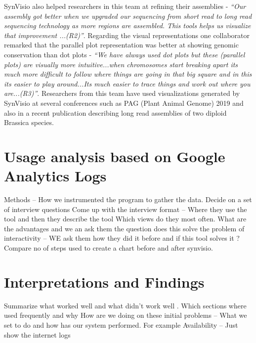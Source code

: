 SynVisio also helped researchers in this team at refining their assemblies - \textit{``Our assembly got better when we upgraded our sequencing from short read to long read sequencing technology as more regions are assembled. This tools helps us visualize that improvement ...(R2)''}. Regarding the visual representations one collaborator remarked that the parallel plot representation was better at showing genomic conservation than dot plots - \textit{``We have always used dot plots but these (parallel plots) are visually more intuitive...when chromosomes start breaking apart its much more difficult to follow where things are going in that big square and in this its easier to play around...Its much easier to trace things and work out where you are...(R3)''}. Researchers from this team have used visualizations generated by SynVisio at several conferences such as PAG (Plant Animal Genome) 2019 \cite{brassicapag} and also in a recent publication describing long read assemblies of two diploid Brassica species\cite{perumal2020high}.
 
\section{Usage analysis based on Google Analytics Logs}
Methods – How we instrumented the program to gather the data.
Decide on a set of interview questions 
Come up with the interview format – Where they use the tool and then they describe the tool
Which views do they most often.
What are the advantages and we an ask them the question does this solve the problem of interactivity – WE ask them how they did it before and if this tool solves it ?
Compare no of steps used to create a chart before and after synvisio.

\section{Interpretations and Findings}  
Summarize what worked well and what didn’t work well .
Which sections where used frequently and why 
How are we doing on these initial problems – What we set to do and how has our system performed.
For example Availability – Just show the internet logs

